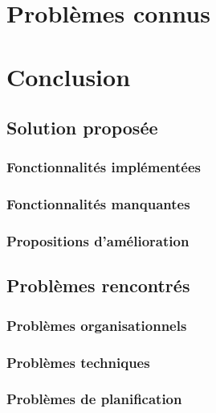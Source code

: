 \documentclass[11pt,a4paper,oldfontcommands]{memoir}
\begin{document}

\chapter{Problèmes connus}


\chapter{Conclusion}

\section{Solution proposée}

\subsection{Fonctionnalités implémentées}

\subsection{Fonctionnalités manquantes}

\subsection{Propositions d'amélioration}

\section{Problèmes rencontrés}

\subsection{Problèmes organisationnels}

\subsection{Problèmes techniques}

\subsection{Problèmes de planification}
\end{document}
